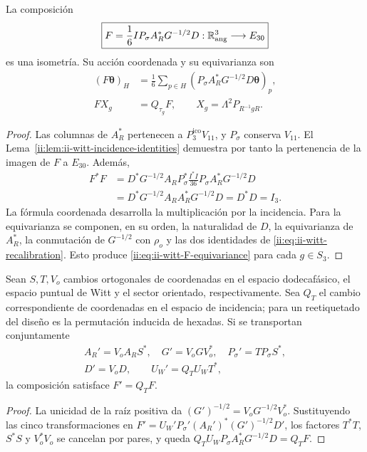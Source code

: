 \begin{theorem}
\label{ii:thm:ii-witt-angular-transport}
La composición
\begin{equation}
 \boxed{F=\frac16 I P_\sigma A_R^*G^{-1/2}D:
        \mathbb R^3_{\rm ang}\longrightarrow E_{30}}
 \label{ii:eq:ii-witt-F}
\end{equation}
es una isometría. Su acción coordenada y su equivarianza son
\begin{align}
 (F\boldsymbol\theta)_H
 &=\frac16\sum_{p\in H}
       (P_\sigma A_R^*G^{-1/2}D\boldsymbol\theta)_p,
       \label{ii:eq:ii-witt-F-coordinates}\\
 F X_g&=Q_{\tau_g}F,
 \qquad X_g=\Lambda^2P_{R^{-1}gR}.
       \label{ii:eq:ii-witt-F-equivariance}
\end{align}
\end{theorem}
\begin{proof}
Las columnas de \(A_R^*\) pertenecen a \(P_3^{\mathrm{ico}}V_{11}\), y
\(P_\sigma\) conserva \(V_{11}\). El
Lema~\ref{ii:lem:ii-witt-incidence-identities} demuestra por tanto la
pertenencia de la imagen de \(F\) a \(E_{30}\). Además,
\begin{align*}
 F^*F
 &=D^*G^{-1/2}A_RP_\sigma^*
       \frac{I^*I}{36}P_\sigma A_R^*G^{-1/2}D\\
 &=D^*G^{-1/2}A_RA_R^*G^{-1/2}D
  =D^*D=I_3.
\end{align*}
La fórmula coordenada desarrolla la multiplicación por la incidencia.
Para la equivarianza se componen, en su orden, la naturalidad de \(D\),
la equivarianza de \(A_R^*\), la conmutación de \(G^{-1/2}\) con
\(\rho_o\) y las dos identidades de
\eqref{ii:eq:ii-witt-recalibration}. Esto produce
\eqref{ii:eq:ii-witt-F-equivariance} para cada \(g\in S_3\).
\end{proof}

\begin{proposition}
\label{ii:prop:ii-witt-gauge-covariance}
Sean \(S,T,V_o\) cambios ortogonales de coordenadas en el espacio
dodecafásico, el espacio puntual de Witt y el sector orientado,
respectivamente. Sea \(Q_T\) el cambio correspondiente de coordenadas
en el espacio de incidencia; para un reetiquetado del diseño es la
permutación inducida de hexadas. Si se transportan conjuntamente
\[
\begin{gathered}
 A_R'=V_oA_RS^*,\quad G'=V_oGV_o^*,\quad
 P_\sigma'=TP_\sigma S^*,\\
 D'=V_oD,\qquad U_W'=Q_TU_WT^*,
\end{gathered}
\]
la composición satisface \(F'=Q_TF\).
\end{proposition}
\begin{proof}
La unicidad de la raíz positiva da
\((G')^{-1/2}=V_oG^{-1/2}V_o^*\). Sustituyendo las cinco
transformaciones en
\(F'=U_W'P_\sigma'(A_R')^*(G')^{-1/2}D'\), los factores
\(T^*T\), \(S^*S\) y \(V_o^*V_o\) se cancelan por pares, y queda
\(Q_TU_WP_\sigma A_R^*G^{-1/2}D=Q_TF\).
\end{proof}

